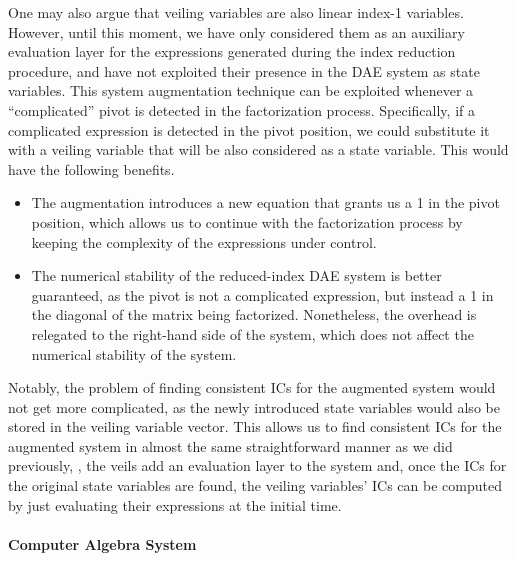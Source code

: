 One may also argue that veiling variables are also linear index-1 variables. However, until this moment, we have only considered them as an auxiliary evaluation layer for the expressions generated during the index reduction procedure, and have not exploited their presence in the \ac{DAE} system as state variables. This system augmentation technique can be exploited whenever a ``complicated'' pivot is detected in the factorization process. Specifically, if a complicated expression is detected in the pivot position, we could substitute it with a veiling variable that will be also considered as a state variable. This would have the following benefits.
%
\begin{itemize}
  \setlength{\itemsep}{0pt}
  \item The augmentation introduces a new equation that grants us a 1 in the pivot position, which allows us to continue with the factorization process by keeping the complexity of the expressions under control.
  \item The numerical stability of the reduced-index \ac{DAE} system is better guaranteed, as the pivot is not a complicated expression, but instead a 1 in the diagonal of the matrix being factorized. Nonetheless, the overhead is relegated to the right-hand side of the system, which does not affect the numerical stability of the system.
\end{itemize}

Notably, the problem of finding consistent \acp{IC} for the augmented system would not get more complicated, as the newly introduced state variables would also be stored in the veiling variable vector. This allows us to find consistent \acp{IC} for the augmented system in almost the same straightforward manner as we did previously, \ie{}, the veils add an evaluation layer to the system and, once the \acp{IC} for the original state variables are found, the veiling variables' \acp{IC} can be computed by just evaluating their expressions at the initial time.

\paragraph{Computer Algebra System}

